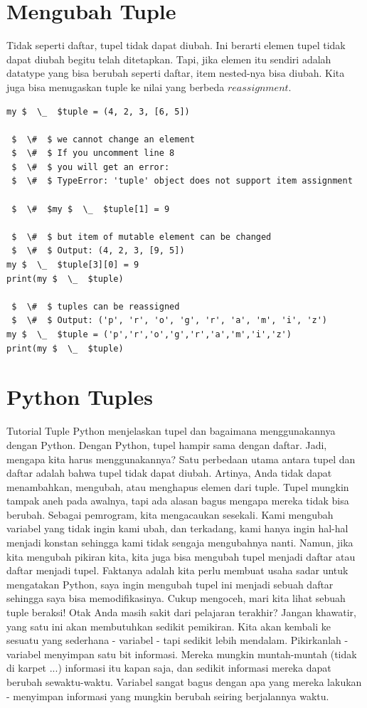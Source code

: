 \section{Mengubah Tuple} 
Tidak seperti daftar, tupel tidak dapat diubah. Ini berarti elemen tupel tidak dapat diubah begitu telah ditetapkan. Tapi, jika elemen itu sendiri adalah datatype yang bisa berubah seperti daftar, item nested-nya bisa diubah. Kita juga bisa menugaskan tuple ke nilai yang berbeda \(reassignment\). 
\begin{verbatim}
my $  \_  $tuple = (4, 2, 3, [6, 5]) 

 $  \#  $ we cannot change an element 
 $  \#  $ If you uncomment line 8 
 $  \#  $ you will get an error: 
 $  \#  $ TypeError: 'tuple' object does not support item assignment 

 $  \#  $my $  \_  $tuple[1] = 9 

 $  \#  $ but item of mutable element can be changed 
 $  \#  $ Output: (4, 2, 3, [9, 5]) 
my $  \_  $tuple[3][0] = 9 
print(my $  \_  $tuple) 

 $  \#  $ tuples can be reassigned 
 $  \#  $ Output: ('p', 'r', 'o', 'g', 'r', 'a', 'm', 'i', 'z') 
my $  \_  $tuple = ('p','r','o','g','r','a','m','i','z') 
print(my $  \_  $tuple) 
\end{verbatim}
\section{Python Tuples} 
Tutorial Tuple Python menjelaskan tupel dan bagaimana menggunakannya dengan Python. Dengan Python, tupel hampir sama dengan daftar. Jadi, mengapa kita harus menggunakannya? Satu perbedaan utama antara tupel dan daftar adalah bahwa tupel tidak dapat diubah. Artinya, Anda tidak dapat menambahkan, mengubah, atau menghapus elemen dari tuple. Tupel mungkin tampak aneh pada awalnya, tapi ada alasan bagus mengapa mereka tidak bisa berubah. Sebagai pemrogram, kita mengacaukan sesekali. Kami mengubah variabel yang tidak ingin kami ubah, dan terkadang, kami hanya ingin hal-hal menjadi konstan sehingga kami tidak sengaja mengubahnya nanti. Namun, jika kita mengubah pikiran kita, kita juga bisa mengubah tupel menjadi daftar atau daftar menjadi tupel. Faktanya adalah kita perlu membuat usaha sadar untuk mengatakan Python, saya ingin mengubah tupel ini menjadi sebuah daftar sehingga saya bisa memodifikasinya. Cukup mengoceh, mari kita lihat sebuah tuple beraksi!
Otak Anda masih sakit dari pelajaran terakhir? Jangan khawatir, yang satu ini akan membutuhkan sedikit pemikiran. Kita akan kembali ke sesuatu yang sederhana - variabel - tapi sedikit lebih mendalam. Pikirkanlah - variabel menyimpan satu bit informasi. Mereka mungkin muntah-muntah (tidak di karpet ...) informasi itu kapan saja, dan sedikit informasi mereka dapat berubah sewaktu-waktu. Variabel sangat bagus dengan apa yang mereka lakukan - menyimpan informasi yang mungkin berubah seiring berjalannya waktu. 

